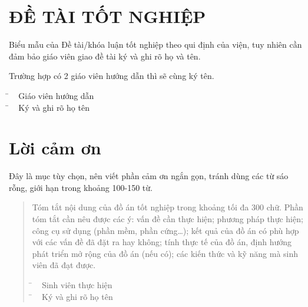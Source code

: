\chapter*{ĐỀ TÀI TỐT NGHIỆP}

Biểu mẫu của Đề tài/khóa luận tốt nghiệp theo qui định của viện, tuy nhiên cần đảm bảo giáo viên giao đề tài ký và ghi rõ họ và tên.
\newline

Trường hợp có 2 giáo viên hướng dẫn thì sẽ cùng ký tên.\\

\vspace{14cm}
\begin{tabbing}
\hspace{9cm}\=\kill
 ~ \> {\large Giáo viên hướng dẫn}\\
 \hspace{9.5cm}\=\kill
 ~ \> Ký và ghi rõ họ tên
\end{tabbing} 

 



 
\chapter*{Lời cảm ơn}

Đây là mục tùy chọn, nên viết phần cảm ơn ngắn gọn, tránh dùng các từ sáo rỗng, giới hạn trong khoảng 100-150 từ.


\begin{abstract}
Tóm tắt nội dung của đồ án tốt nghiệp trong khoảng tối đa 300 chữ. Phần tóm tắt cần nêu được các ý: vấn đề cần thực hiện; phương pháp thực hiện; công cụ sử dụng (phần mềm, phần cứng…); kết quả của đồ án có phù hợp với các vấn đề đã đặt ra hay không; tính thực tế của đồ án, định hướng phát triển mở rộng của đồ án (nếu có); các kiến thức và kỹ năng mà sinh viên đã đạt được.

\vspace{12cm}
\begin{tabbing}
\hspace{9cm}\=\kill
 ~ \> {\large Sinh viên thực hiện}\\
 \hspace{9.4cm}\=\kill
 ~ \> Ký và ghi rõ họ tên
\end{tabbing}
\end{abstract}




\tableofcontents %
\listoftables %
\listoffigures %
